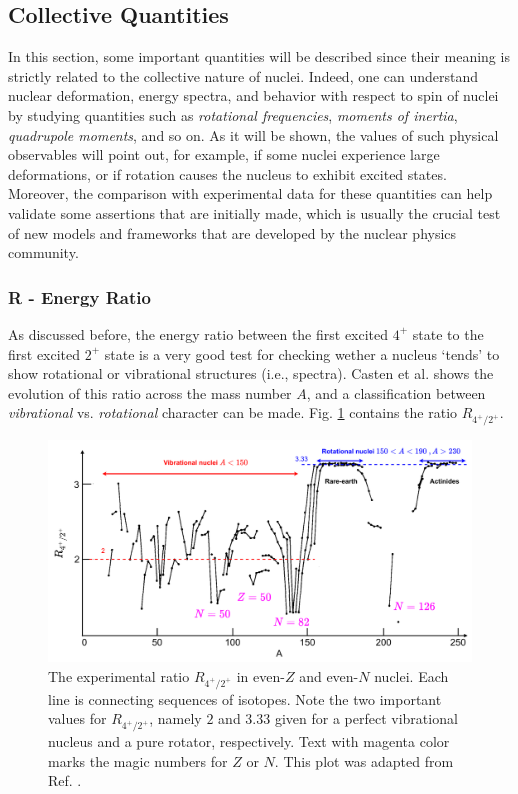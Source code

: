 \subsection{Collective Quantities}

In this section, some important quantities will be described since their meaning is strictly related to the collective nature of nuclei. Indeed, one can understand nuclear deformation, energy spectra, and behavior with respect to spin of nuclei by studying quantities such as \emph{rotational frequencies}, \emph{moments of inertia}, \emph{quadrupole moments}, and so on. As it will be shown, the values of such physical observables will point out, for example, if some nuclei experience large deformations, or if rotation causes the nucleus to exhibit excited states. Moreover, the comparison with experimental data for these quantities can help validate some assertions that are initially made, which is usually the crucial test of new models and frameworks that are developed by the nuclear physics community.

\subsubsection*{R - Energy Ratio}

As discussed before, the energy ratio between the first excited $4^+$ state to the first excited $2^+$ state is a very good test for checking wether a nucleus `tends' to show rotational or vibrational structures (i.e., spectra). Casten et al. \cite{casten2000nuclear} shows the evolution of this ratio across the mass number $A$, and a classification between \emph{vibrational} vs. \emph{rotational} character can be made. Fig. \ref{4state-2state-ratio} contains the ratio $R_{4^+/2^+}$.

\begin{figure}
    \centering
    \includegraphics[scale=0.251]{Chapters/Figures/vibrations_rotations_E42-ratio.pdf}
    \caption{The experimental ratio $R_{4^+/2^+}$ in even-$Z$ and even-$N$ nuclei. Each line is connecting sequences of isotopes. Note the two important values for $R_{4^+/2^+}$, namely $2$ and $3.33$ given for a perfect vibrational nucleus and a pure rotator, respectively. Text with magenta color marks the magic numbers for $Z$ or $N$. This plot was adapted from Ref. \cite{casten2000nuclear}.}
    \label{4state-2state-ratio}
\end{figure}

